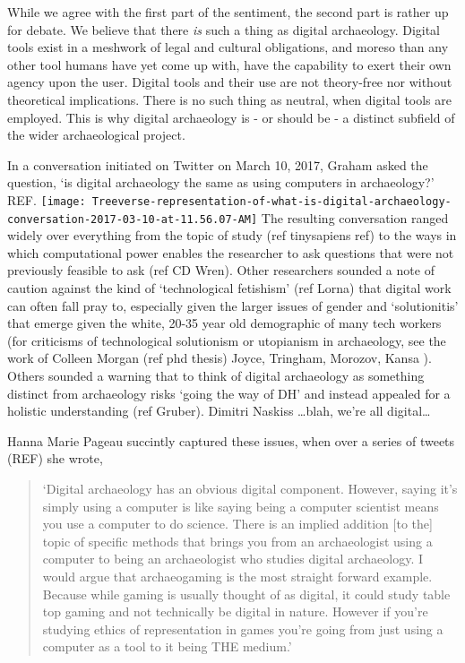 \documentclass[english,]{book}
\begin{document}
While we agree with the first part of the sentiment, the second part is
rather up for debate. We believe that there \emph{is} such a thing as
digital archaeology. Digital tools exist in a meshwork of legal and
cultural obligations, and moreso than any other tool humans have yet
come up with, have the capability to exert their own agency upon the
user. Digital tools and their use are not theory-free nor without
theoretical implications. There is no such thing as neutral, when
digital tools are employed. This is why digital archaeology is - or
should be - a distinct subfield of the wider archaeological project.

In a conversation initiated on Twitter on March 10, 2017, Graham asked
the question, `is digital archaeology the same as using computers in
archaeology?' REF.
\texttt{[image: Treeverse-representation-of-what-is-digital-archaeology-conversation-2017-03-10-at-11.56.07-AM]}
The resulting conversation ranged widely over everything from the topic
of study (ref tinysapiens ref) to the ways in which computational power
enables the researcher to ask questions that were not previously
feasible to ask (ref CD Wren). Other researchers sounded a note of
caution against the kind of `technological fetishism' (ref Lorna) that
digital work can often fall pray to, especially given the larger issues
of gender and `solutionitis' that emerge given the white, 20-35 year old
demographic of many tech workers (for criticisms of technological
solutionism or utopianism in archaeology, see the work of Colleen Morgan
(ref phd thesis) Joyce, Tringham, Morozov, Kansa ). Others sounded a
warning that to think of digital archaeology as something distinct from
archaeology risks `going the way of DH' and instead appealed for a
holistic understanding (ref Gruber). Dimitri Naskiss \ldots{}blah, we're
all digital\ldots{}

Hanna Marie Pageau succintly captured these issues, when over a series
of tweets (REF) she wrote,

\begin{quote}
`Digital archaeology has an obvious digital component. However, saying
it's simply using a computer is like saying being a computer scientist
means you use a computer to do science. There is an implied addition
{[}to the{]} topic of specific methods that brings you from an
archaeologist using a computer to being an archaeologist who studies
digital archaeology. I would argue that archaeogaming is the most
straight forward example. Because while gaming is usually thought of as
digital, it could study table top gaming and not technically be digital
in nature. However if you're studying ethics of representation in games
you're going from just using a computer as a tool to it being THE
medium.'
\end{quote}
\end{document}
